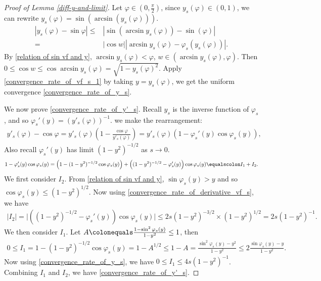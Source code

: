 \documentclass[reqno,10pt]{amsart}
\let\vf=\varphi
\newcommand{\beno}{\begin{eqnarray*}}
\newcommand{\eeno}{\end{eqnarray*}}
\theoremstyle{definition}
\numberwithin{equation}{section}
\begin{document}
\begin{proof}[Proof of Lemma \ref{diff-y-and-limit}]
Let $\vf \in (0,\frac{\pi}{2})$, 
since $y_s(\vf)\in (0,1)$, we can rewrite $y_s(\vf)=\sin(\arcsin(y_s(\vf)))$.
    $$
    \begin{aligned}
        |y_s(\vf)-\sin\vf|
        \leq & 
        |\sin(\arcsin y_s(\vf))-\sin(\vf)|\\
        = &
        |\cos w||\arcsin y_s(\vf)-\vf_s(y_s(\vf))|.
    \end{aligned}
    $$
    By \eqref{relation of sin vf and y}, $\arcsin y_s(\vf)<\vf$, $w\in(\arcsin y_s(\vf),\vf)$. Then $0\leq\cos w \leq \cos\arcsin y_s(\vf)=\sqrt{1-y_s(\vf)^2}$. Apply \eqref{convergence_rate_of_vf_s_1} by taking $y=y_s(\vf)$, we get the uniform convergence \eqref{convergence_rate_of_y_s}.

We now prove \eqref{convergence_rate_of_y'_s}. Recall $y_s$ is the inverse function of $\vf_s$, and so $\vf_s'(y)=(y'_s(\vf))^{-1}$. we make the rearrangement:
\beno
y'_s(\vf)-\cos\vf=y'_s(\vf) (1- \frac{\cos\vf}{y'_s(\vf)})  =y'_s(\vf) (1- \vf_s'(y)  \cos\vf_s(y)),
\eeno
Also recall $\vf_s'(y)$ has limit $(1-y^2)^{-1/2}$ as $s \to 0$.
\beno
	1- \vf_s'(y)  \cos\vf_s(y) = \left( 1- (1-y^2)^{-1/2} \cos\vf_s(y) \right) + \left((1-y^2)^{-1/2} - \vf_s'(y)\right)  \cos\vf_s(y) \equalscolon I_1 + I_2 .
\eeno
We first consider $I_2$.
From \eqref{relation of sin vf and y},  $ \sin\vf_s(y) > y$ and so $\cos\vf_s(y) \leq  (1-y^2)^{1/2}$. Now using \eqref{convergence_rate_of_derivative_vf_s}, we have
\beno
| I_2| =  \Big|\left((1-y^2)^{-1/2} - \vf_s'(y)\right)  \cos\vf_s(y)\Big| \leq  2s (1-y^2)^{-3/2} \times (1-y^2)^{1/2} = 2s (1-y^2)^{-1}.
\eeno
We then consider $I_1$. Let $A \colonequals \frac{1-\sin^2\vf_s(y) }{1-y^2} \leq 1$, then
\beno
0 \leq I_1 =   1- (1-y^2)^{-1/2} \cos\vf_s(y)  = 1- A^{1/2} \leq  1 - A = \frac{\sin^2\vf_s(y) -y^2}{1-y^2}
\leq 2 \frac{\sin \vf_s(y) -y}{1-y^2}.
\eeno
Now using \eqref{convergence_rate_of_y_s}, we have $0 \leq I_1 \leq 4s (1-y^2)^{-1}$.  Combining $I_1$ and $I_2$, we have \eqref{convergence_rate_of_y'_s}.
\end{proof}
\end{document}
